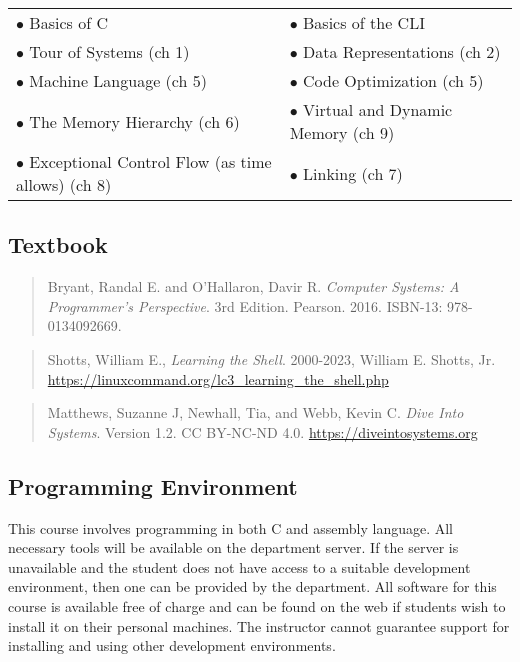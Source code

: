 \documentclass[10pt]{article}
\begin{document}
\begin{center}
\begin{tabular}{ll}
\(\bullet\) Basics of C & \(\bullet\) Basics of the CLI \\
\(\bullet\) Tour of Systems (ch 1) & \(\bullet\) Data Representations (ch 2)\\
\(\bullet\) Machine Language (ch 5) & \(\bullet\) Code Optimization (ch 5) \\
\(\bullet\) The Memory Hierarchy (ch 6) & \(\bullet\) Virtual and Dynamic Memory (ch 9) \\
\(\bullet\) Exceptional Control Flow (as time allows) (ch 8) & \(\bullet\) Linking (ch 7)\\
\end{tabular}
\end{center}

\subsection{Textbook}

\begin{quote}
Bryant, Randal E. and O'Hallaron, Davir R.
\textit{Computer Systems: A Programmer's Perspective}. 3rd Edition. Pearson. 2016. ISBN-13: 978-0134092669.
\end{quote}

\begin{quote}
Shotts, William E., \textit{Learning the Shell}. 2000-2023, William E. Shotts, Jr.
\url{https://linuxcommand.org/lc3_learning_the_shell.php}
\end{quote}

\begin{quote}
Matthews, Suzanne J, Newhall, Tia, and Webb, Kevin C.
\textit{Dive Into Systems}. Version 1.2. CC BY-NC-ND 4.0.
\url{https://diveintosystems.org}
\end{quote}


\subsection{Programming Environment}

This course involves programming in both C and assembly language. All
necessary tools will be available on the department server. If the server is
unavailable and the student does not have access to a suitable development
environment, then one can be provided by the department. All software for this
course is available free of charge and can be found
on the web if students wish to install it on their personal
machines. The instructor cannot guarantee support for installing and
using other development environments.
\end{document}
